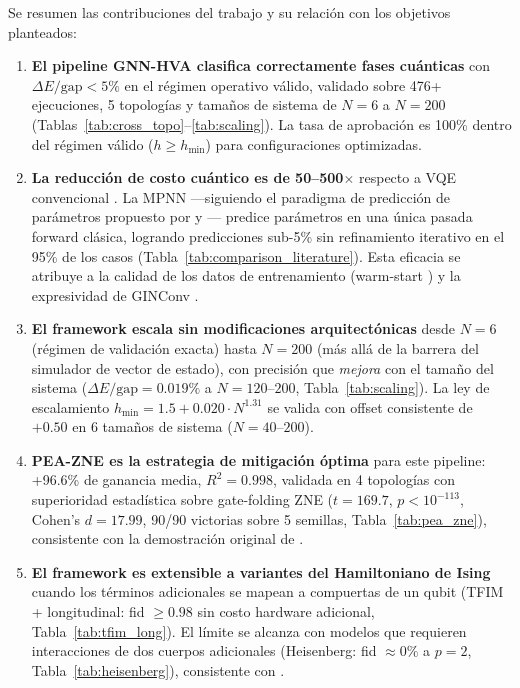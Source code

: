 \documentclass[11pt,a4paper,spanish]{book}
\begin{document}
Se resumen las contribuciones del trabajo y su relación con los objetivos planteados:

\begin{enumerate}
    \item \textbf{El pipeline GNN-HVA clasifica correctamente fases cuánticas} con $\Delta E/\text{gap} < 5\%$ en el régimen operativo válido, validado sobre 476+ ejecuciones, 5 topologías y tamaños de sistema de $N = 6$ a $N = 200$ (Tablas~\ref{tab:cross_topo}--\ref{tab:scaling}). La tasa de aprobación es 100\% dentro del régimen válido ($h \geq h_{\min}$) para configuraciones optimizadas.

    \item \textbf{La reducción de costo cuántico es de 50--500$\times$} respecto a VQE convencional \citep{tilly2022}. La MPNN ---siguiendo el paradigma de predicción de parámetros propuesto por \citet{miao2024} y \citet{zhang2025}--- predice parámetros en una única pasada forward clásica, logrando predicciones sub-5\% sin refinamiento iterativo en el 95\% de los casos (Tabla~\ref{tab:comparison_literature}). Esta eficacia se atribuye a la calidad de los datos de entrenamiento (warm-start \citep{puig2025}) y la expresividad de GINConv \citep{xu2019}.

    \item \textbf{El framework escala sin modificaciones arquitectónicas} desde $N = 6$ (régimen de validación exacta) hasta $N = 200$ (más allá de la barrera del simulador de vector de estado), con precisión que \emph{mejora} con el tamaño del sistema ($\Delta E/\text{gap} = 0.019\%$ a $N = 120$--$200$, Tabla~\ref{tab:scaling}). La ley de escalamiento $h_{\min} = 1.5 + 0.020 \cdot N^{1.31}$ se valida con offset consistente de $+0.50$ en 6 tamaños de sistema ($N = 40$--$200$).

    \item \textbf{PEA-ZNE es la estrategia de mitigación óptima} para este pipeline: +96.6\% de ganancia media, $R^2 = 0.998$, validada en 4 topologías con superioridad estadística sobre gate-folding ZNE ($t = 169.7$, $p < 10^{-113}$, Cohen's $d = 17.99$, 90/90 victorias sobre 5 semillas, Tabla~\ref{tab:pea_zne}), consistente con la demostración original de \citet{kim2023}.

    \item \textbf{El framework es extensible a variantes del Hamiltoniano de Ising} cuando los términos adicionales se mapean a compuertas de un qubit (TFIM + longitudinal: fid $\geq 0.98$ sin costo hardware adicional, Tabla~\ref{tab:tfim_long}). El límite se alcanza con modelos que requieren interacciones de dos cuerpos adicionales (Heisenberg: fid $\approx 0\%$ a $p = 2$, Tabla~\ref{tab:heisenberg}), consistente con \citet{wiersema2020}.


\end{enumerate}
\end{document}
